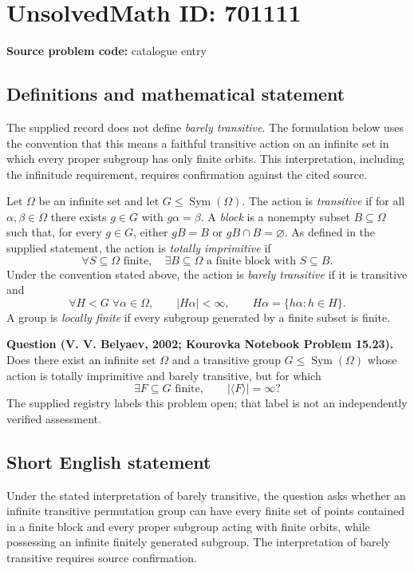 \documentclass[11pt]{article}
\begin{document}
\section*{UnsolvedMath ID: 701111}
\textbf{Source problem code:} catalogue entry
\subsection{Definitions and mathematical statement}
The supplied record does not define \emph{barely transitive}. The formulation below uses the convention that this means a faithful transitive action on an infinite set in which every proper subgroup has only finite orbits. This interpretation, including the infinitude requirement, requires confirmation against the cited source.

Let \(\Omega\) be an infinite set and let \(G\leq\operatorname{Sym}(\Omega)\). The action is \emph{transitive} if for all \(\alpha,\beta\in\Omega\) there exists \(g\in G\) with \(g\alpha=\beta\). A \emph{block} is a nonempty subset \(B\subseteq\Omega\) such that, for every \(g\in G\), either \(gB=B\) or \(gB\cap B=\varnothing\). As defined in the supplied statement, the action is \emph{totally imprimitive} if
\[
\forall S\subseteq\Omega\text{ finite},\quad
\exists B\subseteq\Omega\text{ a finite block with }S\subseteq B.
\]
Under the convention stated above, the action is \emph{barely transitive} if it is transitive and
\[
\forall H<G\;\forall\alpha\in\Omega,\qquad
|H\alpha|<\infty,
\qquad H\alpha=\{h\alpha:h\in H\}.
\]
A group is \emph{locally finite} if every subgroup generated by a finite subset is finite.

\textbf{Question (V. V. Belyaev, 2002; Kourovka Notebook Problem 15.23).} Does there exist an infinite set \(\Omega\) and a transitive group \(G\leq\operatorname{Sym}(\Omega)\) whose action is totally imprimitive and barely transitive, but for which
\[
\exists F\subseteq G\text{ finite},\qquad |\langle F\rangle|=\infty?
\]
The supplied registry labels this problem open; that label is not an independently verified assessment.
\subsection{Short English statement}
Under the stated interpretation of barely transitive, the question asks whether an infinite transitive permutation group can have every finite set of points contained in a finite block and every proper subgroup acting with finite orbits, while possessing an infinite finitely generated subgroup. The interpretation of barely transitive requires source confirmation.
\end{document}
